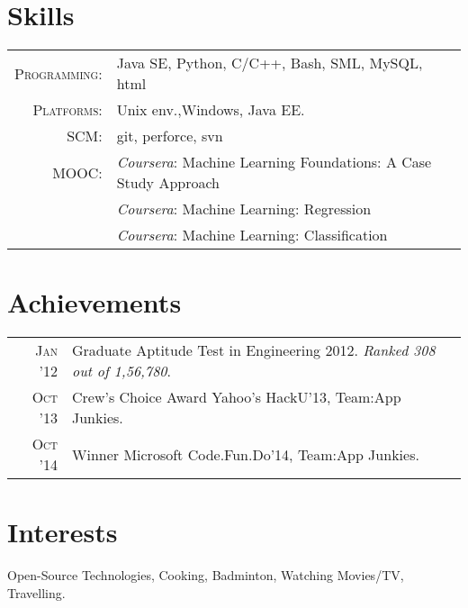 \documentclass[a4paper,10pt]{article}
\begin{document}
\section{Skills}
\begin{tabular}{rp{15cm}}
\textsc{Programming:} & Java SE, Python, C/C++, Bash, SML, MySQL, html\\
\textsc{Platforms:} & Unix env.,Windows, Java EE.\\
\textsc{SCM:} & git, perforce, svn\\
\textsc{MOOC:} & \emph{Coursera}: Machine Learning Foundations: A Case Study Approach\\ &\normalsize \emph{Coursera}: Machine Learning: Regression \\ &\normalsize \emph{Coursera}: Machine Learning: Classification
\end{tabular}

\section{Achievements}
\begin{tabular}{rp{15cm}}
\textsc{Jan '12} & Graduate Aptitude Test in Engineering 2012. \emph{Ranked 308 out of 1,56,780}.\\
\textsc{Oct '13} & Crew’s Choice Award Yahoo's HackU’13, Team:App Junkies.\\
\textsc{Oct '14} & Winner Microsoft Code.Fun.Do’14, Team:App Junkies.\\
\end{tabular}

\section{Interests}
Open-Source Technologies, Cooking, Badminton, Watching Movies/TV, Travelling.

\end{document}
